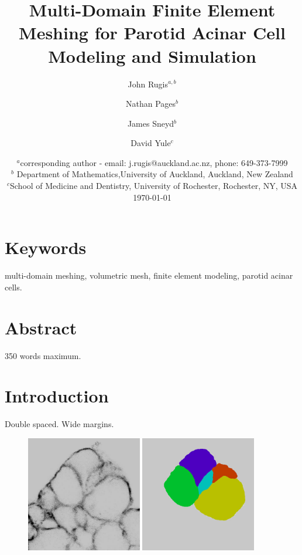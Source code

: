 \documentclass[a4paper,10pt]{article}
\title{Multi-Domain Finite Element Meshing for Parotid Acinar Cell Modeling and Simulation}
\author{John Rugis$^{a,b}$ \and Nathan Pages$^b$ \and James Sneyd$^b$ \and David Yule$^c$}
\date{%
  $^a$corresponding author - email: j.rugis@auckland.ac.nz, phone: 649-373-7999\\%
  $^b$ Department of Mathematics,University of Auckland, Auckland, New Zealand\\%
  $^c$School of Medicine and Dentistry, University of Rochester, Rochester, NY, USA\\[2ex]%
  \today
}
\begin{document}
\maketitle

\newpage
\section*{Keywords}
multi-domain meshing, volumetric mesh, finite element modeling, parotid acinar cells.\\

\section*{Abstract}
350 words maximum.\\

\section{Introduction}
Double spaced. Wide margins.\\

\begin{figure}[H]
\begin{center}
\includegraphics[width=0.45\textwidth]{images/cells-stack-16_crop.jpg}
\hspace{0.5cm}
\includegraphics[width=0.45\textwidth]{images/cells-stack-16_seg_crop.jpg}
\end{center}
\end{figure}
\end{document}
